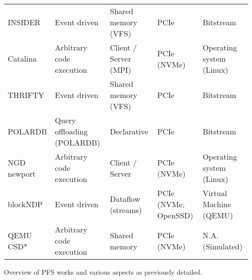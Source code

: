 \begin{table}[H]
\begin{adjustbox}{width=1\textwidth}
\begin{threeparttable}[]
\begin{tabular}{lllll}
                INSIDER \cite{234968} & Event driven & Shared memory (VFS) & PCIe & Bitstream \\
                Catalina \cite{8855540} & Arbitrary code execution & Client / Server (MPI) & PCIe (NVMe) & Operating system (Linux) \\
                THRIFTY \cite{10.1145/3400302.3415723} & Event driven\footnotemark[9] & Shared memory (VFS)\footnotemark[9] & PCIe\footnotemark[9] & Bitstream\footnotemark[9] \\
                POLARDB \cite{246154} & Query offloading (POLARDB) & Declarative & PCIe & Bitstream \\
                NGD newport \cite{10.1145/3415580} & Arbitrary code execution & Client / Server & PCIe (NVMe) & Operating system (Linux) \\
                blockNDP \cite{10.1145/3429357.3430519} & Event driven & Dataflow (streams) & PCIe (NVMe, OpenSSD) & Virtual Machine (QEMU) \\
                QEMU CSD* \cite{10.1145/3439839.3459085} & Arbitrary code execution & Shared memory & PCIe (NVMe) & N.A. (Simulated) \\
                \bottomrule
            \end{tabular}
            \begin{tablenotes}
                \centering Overview of PFS works and various aspects as
                    previously detailed.
            \end{tablenotes}
        \end{threeparttable}
        \label{table:pfsoverview}
    \end{adjustbox}
\end{table}



